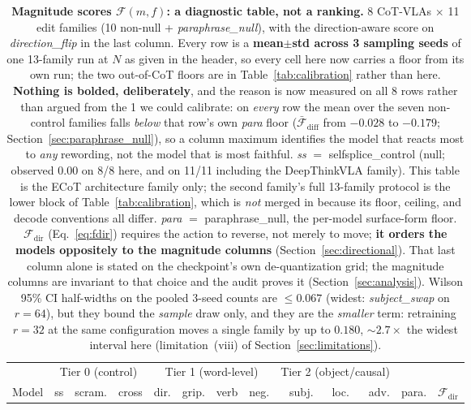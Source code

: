 \documentclass{article}
\begin{document}
\begin{table}[t]
\centering\scriptsize
\caption{\textbf{Magnitude scores $\mathcal{F}(m, f)$: a diagnostic table, not a ranking.} 8 CoT-VLAs $\times$ 11 edit families (10 non-null + \emph{paraphrase\_null}), with the direction-aware score on \emph{direction\_flip} in the last column. Every row is a \textbf{mean$\pm$std across 3 sampling seeds} of one 13-family run at $N$ as given in the header, so every cell here now carries a floor from its own run; the two out-of-CoT floors are in Table~\ref{tab:calibration} rather than here. \textbf{Nothing is bolded, deliberately}, and the reason is now measured on all 8 rows rather than argued from the 1 we could calibrate: on \emph{every} row the mean over the seven non-control families falls \emph{below} that row's own \emph{para} floor ($\bar{\mathcal{F}}_{\text{diff}}$ from $-0.028$ to $-0.179$; Section~\ref{sec:paraphrase_null}), so a column maximum identifies the model that reacts most to \emph{any} rewording, not the model that is most faithful. \emph{ss} $=$ selfsplice\_control (null; observed $0.00$ on 8/8 here, and on 11/11 including the DeepThinkVLA family). This table is the ECoT architecture family only; the second family's full 13-family protocol is the lower block of Table~\ref{tab:calibration}, which is \emph{not} merged in because its floor, ceiling, and decode conventions all differ. \emph{para} $=$ paraphrase\_null, the per-model surface-form floor. $\mathcal{F}_{\text{dir}}$ (Eq.~\ref{eq:fdir}) requires the action to reverse, not merely to move; \textbf{it orders the models oppositely to the magnitude columns} (Section~\ref{sec:directional}). That last column alone is stated on the checkpoint's own de-quantization grid; the magnitude columns are invariant to that choice and the audit proves it (Section~\ref{sec:analysis}). Wilson 95\% CI half-widths on the pooled 3-seed counts are $\leq 0.067$ (widest: \emph{subject\_swap} on $r{=}64$), but they bound the \emph{sample} draw only, and they are the \emph{smaller} term: retraining $r{=}32$ at the same configuration moves a single family by up to $0.180$, ${\sim}2.7\times$ the widest interval here (limitation~(viii) of Section~\ref{sec:limitations}).}
\label{tab:leaderboard}
\begin{tabular}{l r r r r r r r r r r r | r}
\toprule
& \multicolumn{3}{c}{Tier 0 (control)} & \multicolumn{4}{c}{Tier 1 (word-level)} & \multicolumn{3}{c}{Tier 2 (object/causal)} & & \\
\cmidrule(lr){2-4}\cmidrule(lr){5-8}\cmidrule(lr){9-11}
Model & ss & scram. & cross & dir. & grip. & verb & neg. & subj. & loc. & adv. & para. & $\mathcal{F}_{\text{dir}}$ \\

\end{tabular}
\end{table}
\end{document}
